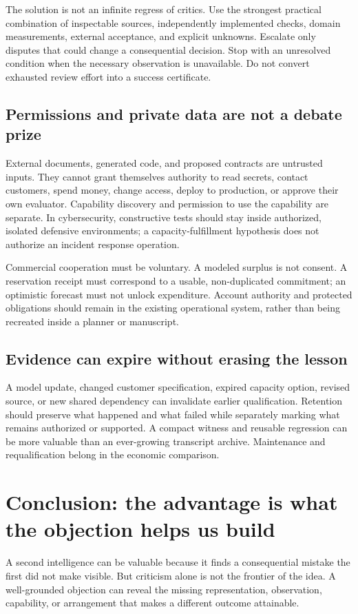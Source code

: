 \documentclass[11pt,a4paper]{article}
\begin{document}
The solution is not an infinite regress of critics. Use the strongest practical combination of inspectable sources, independently implemented checks, domain measurements, external acceptance, and explicit unknowns. Escalate only disputes that could change a consequential decision. Stop with an unresolved condition when the necessary observation is unavailable. Do not convert exhausted review effort into a success certificate.

\subsection{Permissions and private data are not a debate prize}
External documents, generated code, and proposed contracts are untrusted inputs. They cannot grant themselves authority to read secrets, contact customers, spend money, change access, deploy to production, or approve their own evaluator. Capability discovery and permission to use the capability are separate. In cybersecurity, constructive tests should stay inside authorized, isolated defensive environments; a capacity-fulfillment hypothesis does not authorize an incident response operation.

Commercial cooperation must be voluntary. A modeled surplus is not consent. A reservation receipt must correspond to a usable, non-duplicated commitment; an optimistic forecast must not unlock expenditure. Account authority and protected obligations should remain in the existing operational system, rather than being recreated inside a planner or manuscript.

\subsection{Evidence can expire without erasing the lesson}
A model update, changed customer specification, expired capacity option, revised source, or new shared dependency can invalidate earlier qualification. Retention should preserve what happened and what failed while separately marking what remains authorized or supported. A compact witness and reusable regression can be more valuable than an ever-growing transcript archive. Maintenance and requalification belong in the economic comparison.

\clearpage
\section{Conclusion: the advantage is what the objection helps us build}
A second intelligence can be valuable because it finds a consequential mistake the first did not make visible. But criticism alone is not the frontier of the idea. A well-grounded objection can reveal the missing representation, observation, capability, or arrangement that makes a different outcome attainable.
\end{document}
